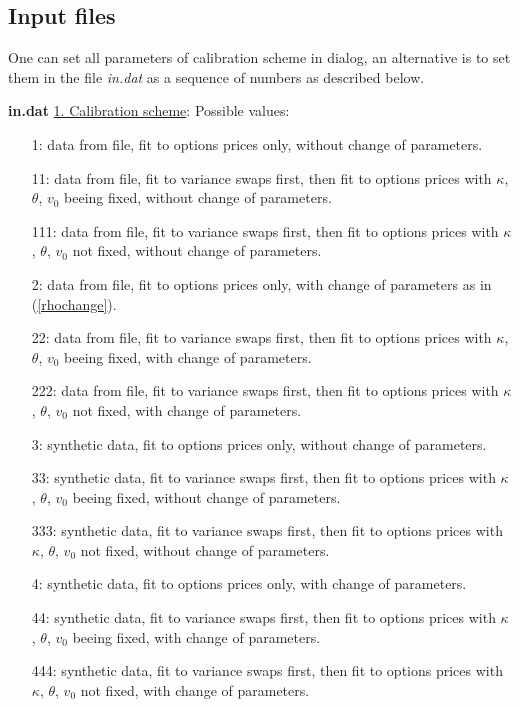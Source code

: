 \documentclass[12pt,amsfonts,enumerate,amscd]{amsart}
\numberwithin{table}{section}
\numberwithin{equation}{section}
\newcommand{\eq}[1]{(\ref{#1})}
\begin{document}
\subsection{Input files}
One can set all parameters of calibration scheme in dialog, an alternative is to set them in the file \textit{in.dat} as a sequence of numbers as described below.

\vskip0.2cm
\textbf{in.dat}  
\vskip0.2cm
\underline{ 1. Calibration scheme}:
Possible values:
\begin{itemize}
\item[1:] data from file, fit to options prices only, without change of parameters. 

\item[11:] data from file, fit to variance swaps first, then fit to options prices with $\kappa$, $\theta$, $v_0$ beeing fixed, without change of parameters.

\item[111:] data from file, fit to variance swaps first, then fit to options prices with $\kappa$, $\theta$, $v_0$ not fixed, without change of parameters.

\item[2:] data from file, fit to options prices only, with change of parameters as in \eq{rhochange}.

\item[22:] data from file, fit to variance swaps first, then fit to options prices with $\kappa$, $\theta$, $v_0$ beeing fixed, with change of parameters.

\item[222:] data from file, fit to variance swaps first, then fit to options prices with $\kappa$, $\theta$, $v_0$ not fixed, with change of parameters.

\item[3:] synthetic data, fit to options prices only, without change of parameters.

\item[33:] synthetic data, fit to variance swaps first, then fit to options prices with $\kappa$, $\theta$, $v_0$ beeing fixed, without change of parameters.

\item[333:] synthetic data, fit to variance swaps first, then fit to options prices with $\kappa$, $\theta$, $v_0$ not fixed, without change of parameters.

\item[4:] synthetic data, fit to options prices only, with change of parameters.

\item[44:] synthetic data, fit to variance swaps first, then fit to options prices with $\kappa$, $\theta$, $v_0$ beeing fixed, with change of parameters.

\item[444:] synthetic data, fit to variance swaps first, then fit to options prices with $\kappa$, $\theta$, $v_0$ not fixed, with change of parameters.
\end{itemize}
\end{document}
